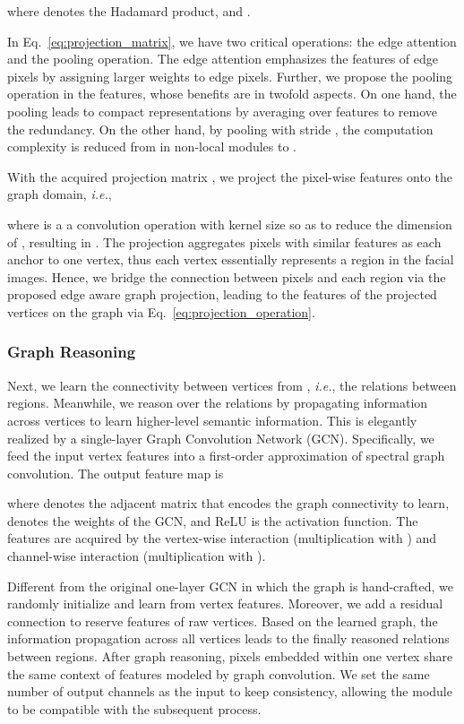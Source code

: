\documentclass[runningheads]{llncs}
\def\ie{{\it i.e.}}
\begin{document}
where  denotes the Hadamard product, and . 

In Eq.~\eqref{eq:projection_matrix}, we have two critical operations: the edge attention and the pooling operation. 
The edge attention emphasizes the features of edge pixels by assigning larger weights to edge pixels.
Further, we propose the pooling operation in the features, whose benefits are in twofold aspects. 
On one hand, the pooling leads to compact representations by averaging over features to remove the redundancy. 
On the other hand, by pooling with stride , the computation complexity is reduced from  in non-local modules to .

With the acquired projection matrix , we project the pixel-wise features  onto the graph domain, \ie, 

where  is a a convolution operation with  kernel size so as to reduce the dimension of , resulting in .
The projection aggregates pixels with similar features as each anchor to one vertex, thus each vertex essentially represents a region in the facial images. 
Hence, we bridge the connection between pixels and each region via the proposed edge aware graph projection, leading to the features of the projected vertices on the graph  via Eq.~\eqref{eq:projection_operation}. 

\subsubsection{Graph Reasoning}

Next, we learn the connectivity between vertices from , \ie, the relations between regions. 
Meanwhile, we reason over the relations by propagating information across vertices to learn higher-level semantic information. 
This is elegantly realized by a single-layer Graph Convolution Network (GCN). 
Specifically, we feed the input vertex features  into a first-order approximation of spectral graph convolution. 
The output feature map  is

where  denotes the adjacent matrix that encodes the graph connectivity to learn,  denotes the weights of the GCN, and ReLU is the activation function. 
The features  are acquired by the vertex-wise interaction (multiplication with ) and channel-wise interaction (multiplication with ). 

Different from the original one-layer GCN \cite{kipf2016semi} in which the graph  is hand-crafted, we randomly initialize  and learn from vertex features.
Moreover, we add a residual connection to reserve features of raw vertices. 
Based on the learned graph, the information propagation across all vertices leads to the finally reasoned relations between regions.  
After graph reasoning, pixels embedded within one vertex share the same context of features modeled by graph convolution. 
We set the same number of output channels as the input to keep consistency, allowing the module to be compatible with the subsequent process.
\end{document}
